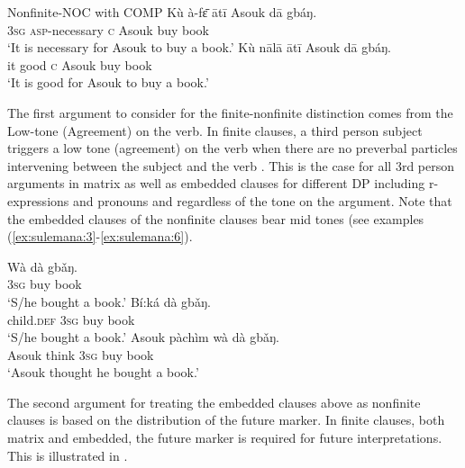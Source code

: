\documentclass[output=paper,colorlinks,citecolor=brown]{langscibook}
\begin{document}
\ea%
    \label{ex:sulemana:6}
    Nonfinite-NOC with COMP
    \ea%
    \label{ex:sulemana:6a}
    \gll    Kù à-fɛ̄ ātī Asouk dā gbáŋ.\\
            \textsc{3sg} \textsc{asp}-necessary \textsc{c} Asouk buy book\\
    \glt    `It is necessary for Asouk to buy a book.' 
    \ex%
    \label{ex:sulemana:6b}
    \gll    Kù nālā ātī Asouk dā gbáŋ.\\
            it good \textsc{c} Asouk buy book\\
    \glt    `It is good for Asouk to buy a book.' 
    \z
\z

The first argument to consider for the finite-nonfinite distinction comes from the Low-tone (Agreement) on the verb. In finite clauses, a third person subject triggers a low tone (agreement) on the verb when there are no preverbal particles intervening between the subject and the verb . This is the case for all 3rd person arguments in matrix as well as embedded clauses for different DP including r-expressions and pronouns and regardless of the tone on the argument. Note that the embedded clauses of the nonfinite clauses bear mid tones (see examples (\ref{ex:sulemana:3}-\ref{ex:sulemana:6}). 

\ea%
    \label{ex:sulemana:7}
    \ea%
    \label{ex:sulemana:7a}
    \gll    Wà dà gbǎŋ.  \\
            \textsc{3sg}  buy book\\
    \glt    `S/he bought a book.'
    \ex%
    \label{ex:sulemana:7b}
    \gll    Bí:ká dà gbǎŋ.  \\
            child.\textsc{def} \textsc{3sg}  buy book\\
    \glt    `S/he bought a book.' 
    \ex%
    \label{ex:sulemana:7c}
    \gll    Asouk pàchìm wà dà gbǎŋ.  \\
            Asouk think \textsc{3sg} buy book\\
    \glt    `Asouk thought he bought a book.' 
    \z
\z

The second argument for treating the embedded clauses above as nonfinite clauses is based on the distribution of the future marker. In finite clauses, both matrix and embedded, the future marker is required for future interpretations. This is illustrated in .
\end{document}
